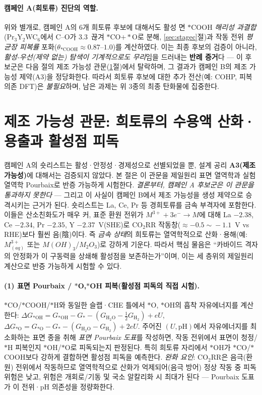 \documentclass[11pt,a4paper]{report}
\begin{document}
\paragraph{캠페인 A(희토류) 진단의 역할.} 위와 별개로, 캠페인 A의 6개 희토류 후보에 대해서도 활성 면
$*$COOH \emph{해리성 과결합}(Pr$_3$Y$_2$WC$_6$에서 C--O가 3.3~ 끊겨 $*$CO$+*$O로 분해,
\ref{sec:stagec}절)과 작동 전위 \emph{평균장 피복률} 포화($\theta_{*\mathrm{COOH}}\!\approx\!0.87$--$1.0$)를
계산하였다. 이는 최종 후보의 검증이 아니라, \emph{활성-우선(제약 없는) 탐색이 기계적으로도 무리}임을
드러내는 \textbf{반례 증거}다 --- 이 후보군은 다음 절의 제조 가능성 관문(\ref{sec:ree-stability}절)에서
탈락하며, 그 결과가 캠페인 B의 제조 가능성 제약(A3)을 정당화한다. 따라서 희토류 후보에 대한 추가
전산(예: COHP, 피복 의존 DFT)은 \emph{불필요}하며, 남은 과제는 위 3종의 최종 탄화물에 집중한다.

\section{제조 가능성 관문: 희토류의 수용액 산화·용출과 활성점 피독}
\label{sec:ree-stability}
캠페인 A의 숏리스트는 활성·안정성·경제성으로 선별되었을 뿐, 설계 공리 \textbf{A3(제조 가능성)}에
대해서는 검증되지 않았다. 본 절은 이 관문을 제일원리 표면 열역학과 실험열역학 Pourbaix로 반증
가능하게 시험한다. \emph{결론부터, 캠페인 A 후보군은 이 관문을 통과하지 못한다} --- 그리고 이 사실이
캠페인 B에서 제조 가능성을 생성 제약으로 승격시키는 근거가 된다. 숏리스트는 La, Ce, Pr 등 경희토류를
금속 부격자에 포함한다. 이들은 산소친화도가 매우 커,
표준 환원 전위가 $M^{3+}\!+\!3e^-\!\to\!M$에 대해 La $-2.38$, Ce $-2.34$, Pr $-2.35$, Y $-2.37$~V(SHE)로
CO$_2$RR 작동창($\approx -0.5\!\sim\!-1.1$~V vs RHE)보다 훨씬 음(陰)이다. 즉 \emph{금속 상태}의
희토류는 열역학적으로 산화·용해(예: $M^{3+}_{(aq)}$ 또는 $M(OH)_3$/$M_2O_3$)로 강하게 기운다.
따라서 핵심 물음은 ``카바이드 격자의 안정화가 이 구동력을 상쇄해 활성점을 보존하는가''이며,
이는 세 층위의 제일원리 계산으로 반증 가능하게 시험할 수 있다.

\paragraph{(1) 표면 Pourbaix / $*$O,$*$OH 피복(활성점 피독의 직접 시험).} $*$CO/$*$COOH/$*$H와
동일한 슬랩·CHE 틀에서 $*$O, $*$OH의 흡착 자유에너지를 계산한다:
$\Delta G_{*\mathrm{OH}}=G_{*\mathrm{OH}}-G_*-(G_{\mathrm{H_2O}}-\tfrac12 G_{\mathrm{H_2}})+eU$,
$\Delta G_{*\mathrm{O}}=G_{*\mathrm{O}}-G_*-(G_{\mathrm{H_2O}}-G_{\mathrm{H_2}})+2eU$.
주어진 $(U,\mathrm{pH})$에서 자유에너지를 최소화하는 표면 종을 취해 \emph{표면 Pourbaix 도표}를
작성하면, 작동 전위에서 표면이 청정/$*$H 피복인지 $*$OH/$*$O로 피독되는지 판정된다. 특히 희토류
자리에서 $*$OH가 $*$CO/$*$COOH보다 강하게 결합하면 활성점 피독을 예측한다. \emph{완화 요인}:
CO$_2$RR은 음극(환원) 전위에서 작동하므로 열역학적으로 산화가 억제되어(음극 방어) 정상 작동 중
피독 위험은 낮고, 위험은 개회로/기동 및 국소 알칼리화 시 최대가 된다 --- Pourbaix 도표가 이
전위·pH 의존성을 정량화한다.
\end{document}

